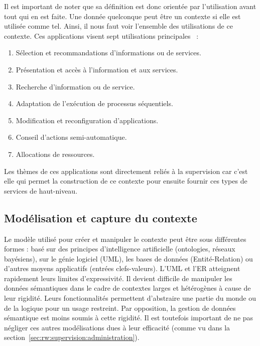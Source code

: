Il est important de noter que sa définition est donc orientée par l'utilisation avant tout qui en est faite. Une donnée quelconque peut être un contexte si elle est utilisée comme tel. Ainsi, il nous faut voir l'ensemble des utilisations de ce contexte. Ces applications visent sept utilisations principales~\cite{Soylu:context} : 
\begin{enumerate}
	\item Sélection et recommandations d'informations ou de services.
	\item Présentation et accès à l'information et aux services.
	\item Recherche d'information ou de service.
	\item Adaptation de l'exécution de processus séquentiels.
	\item Modification et reconfiguration d'applications.
	\item Conseil d'actions semi-automatique.
	\item Allocations de ressources.
\end{enumerate}
Les thèmes de ces applications sont directement reliés à la supervision car c'est elle qui permet la construction de ce contexte pour ensuite fournir ces types de services de haut-niveau.

\subsection{Modélisation et capture du contexte}
Le modèle utilisé pour créer et manipuler le contexte peut être sous différentes formes : basé sur des principes d'intelligence artificielle (ontologies, réseaux bayésiens), sur le génie logiciel (UML), les bases de données (Entité-Relation) ou d'autres moyens applicatifs (entrées clefs-valeurs). L'UML et l'ER atteignent rapidement leurs limites d'expressivité. Il devient difficile de manipuler les données sémantiques dans le cadre de contextes larges et hétérogènes à cause de leur rigidité. Leurs fonctionnalités permettent d'abstraire une partie du monde ou de la logique pour un usage restreint. Par opposition, la gestion de données sémantique est moins soumis à cette rigidité. Il est toutefois important de ne pas négliger ces autres modélisations dues à leur efficacité (comme vu dans la section~\ref{sec:rw:supervision:administration}).

